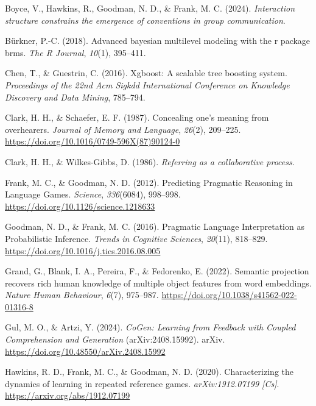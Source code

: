 \documentclass[10pt, letterpaper]{article}
\begin{document}
\label{refs}
\begin{CSLReferences}{1}{0}
Boyce, V., Hawkins, R., Goodman, N. D., \& Frank, M. C. (2024).
\emph{Interaction structure constrains the emergence of conventions in
group communication}.

Bürkner, P.-C. (2018). Advanced bayesian multilevel modeling with the r
package brms. \emph{The R Journal}, \emph{10}(1), 395--411.

Chen, T., \& Guestrin, C. (2016). Xgboost: {A} scalable tree boosting
system. \emph{Proceedings of the 22nd Acm Sigkdd International
Conference on Knowledge Discovery and Data Mining}, 785--794.

Clark, H. H., \& Schaefer, E. F. (1987). Concealing one's meaning from
overhearers. \emph{Journal of Memory and Language}, \emph{26}(2),
209--225. \url{https://doi.org/10.1016/0749-596X(87)90124-0}

Clark, H. H., \& Wilkes-Gibbs, D. (1986). \emph{Referring as a
collaborative process}.

Frank, M. C., \& Goodman, N. D. (2012). Predicting {Pragmatic Reasoning}
in {Language Games}. \emph{Science}, \emph{336}(6084), 998--998.
\url{https://doi.org/10.1126/science.1218633}

Goodman, N. D., \& Frank, M. C. (2016). Pragmatic {Language
Interpretation} as {Probabilistic Inference}. \emph{Trends in Cognitive
Sciences}, \emph{20}(11), 818--829.
\url{https://doi.org/10.1016/j.tics.2016.08.005}

Grand, G., Blank, I. A., Pereira, F., \& Fedorenko, E. (2022). Semantic
projection recovers rich human knowledge of multiple object features
from word embeddings. \emph{Nature Human Behaviour}, \emph{6}(7),
975--987. \url{https://doi.org/10.1038/s41562-022-01316-8}

Gul, M. O., \& Artzi, Y. (2024). \emph{{CoGen}: {Learning} from
{Feedback} with {Coupled Comprehension} and {Generation}}
(arXiv:2408.15992). arXiv.
\url{https://doi.org/10.48550/arXiv.2408.15992}

Hawkins, R. D., Frank, M. C., \& Goodman, N. D. (2020). Characterizing
the dynamics of learning in repeated reference games.
\emph{arXiv:1912.07199 {[}Cs{]}}. \url{https://arxiv.org/abs/1912.07199}


\end{CSLReferences}
\end{document}
